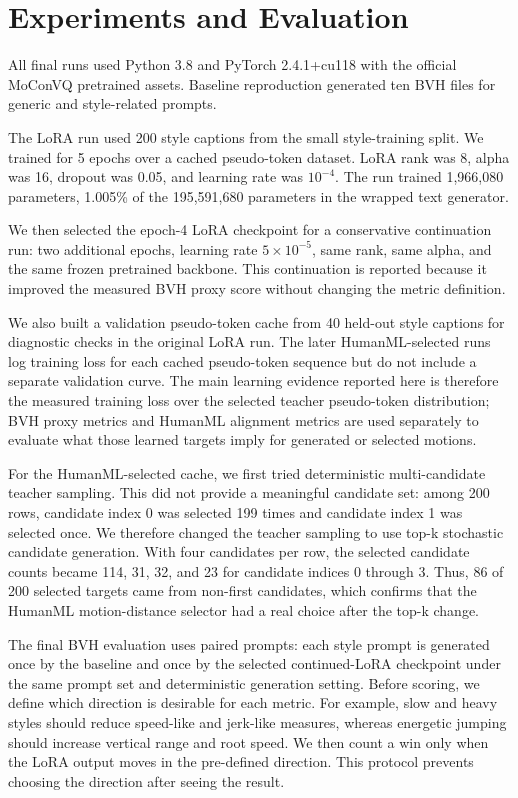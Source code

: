 \documentclass[conference]{IEEEtran}
\begin{document}
\section{Experiments and Evaluation}
All final runs used Python 3.8 and PyTorch 2.4.1+cu118 with the official MoConVQ pretrained assets. Baseline reproduction generated ten BVH files for generic and style-related prompts.

The LoRA run used 200 style captions from the small style-training split. We trained for 5 epochs over a cached pseudo-token dataset. LoRA rank was 8, alpha was 16, dropout was 0.05, and learning rate was $10^{-4}$. The run trained 1,966,080 parameters, 1.005\% of the 195,591,680 parameters in the wrapped text generator.

We then selected the epoch-4 LoRA checkpoint for a conservative continuation run: two additional epochs, learning rate $5 \times 10^{-5}$, same rank, same alpha, and the same frozen pretrained backbone. This continuation is reported because it improved the measured BVH proxy score without changing the metric definition.

We also built a validation pseudo-token cache from 40 held-out style captions for diagnostic checks in the original LoRA run. The later HumanML-selected runs log training loss for each cached pseudo-token sequence but do not include a separate validation curve. The main learning evidence reported here is therefore the measured training loss over the selected teacher pseudo-token distribution; BVH proxy metrics and HumanML alignment metrics are used separately to evaluate what those learned targets imply for generated or selected motions.

For the HumanML-selected cache, we first tried deterministic multi-candidate teacher sampling. This did not provide a meaningful candidate set: among 200 rows, candidate index 0 was selected 199 times and candidate index 1 was selected once. We therefore changed the teacher sampling to use top-k stochastic candidate generation. With four candidates per row, the selected candidate counts became 114, 31, 32, and 23 for candidate indices 0 through 3. Thus, 86 of 200 selected targets came from non-first candidates, which confirms that the HumanML motion-distance selector had a real choice after the top-k change.

The final BVH evaluation uses paired prompts: each style prompt is generated once by the baseline and once by the selected continued-LoRA checkpoint under the same prompt set and deterministic generation setting. Before scoring, we define which direction is desirable for each metric. For example, slow and heavy styles should reduce speed-like and jerk-like measures, whereas energetic jumping should increase vertical range and root speed. We then count a win only when the LoRA output moves in the pre-defined direction. This protocol prevents choosing the direction after seeing the result.
\end{document}
